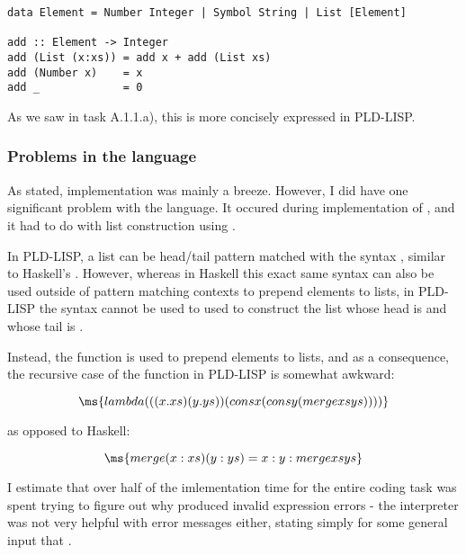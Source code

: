 \begin{verbatim}
data Element = Number Integer | Symbol String | List [Element]

add :: Element -> Integer
add (List (x:xs)) = add x + add (List xs)
add (Number x)    = x
add _             = 0
\end{verbatim}

As we saw in task A.1.1.a), this is more concisely expressed in PLD-LISP.

\sectend

\newpage
\subsubsection{Problems in the language}

As stated, implementation was mainly a breeze. However, I did have one
significant problem with the language. It occured during implementation of
, and it had to do with list construction using .

\smallskip

In PLD-LISP, a list can be head/tail pattern matched with the syntax , similar to Haskell's . However, whereas in Haskell
this exact same syntax can also be used outside of pattern matching contexts to
prepend elements to lists, in PLD-LISP the syntax  cannot be used
to used to construct the list whose head is  and whose tail is .

\medskip

Instead, the  function is used to prepend elements to lists, and as a
consequence, the recursive case of the  function in PLD-LISP is
somewhat awkward:

$$
\ms{lambda (((x . xs) (y . ys)) (cons x (cons y (merge xs ys))))}
$$

\noindent as opposed to Haskell:

$$
\ms{merge (x:xs) (y:ys) = x : y : merge xs ys}
$$

I estimate that over half of the imlementation time for the entire coding task
was spent trying to figure out why  produced
invalid expression errors - the interpreter was not very helpful with error
messages either, stating simply for some general input  that .

\Sectend
